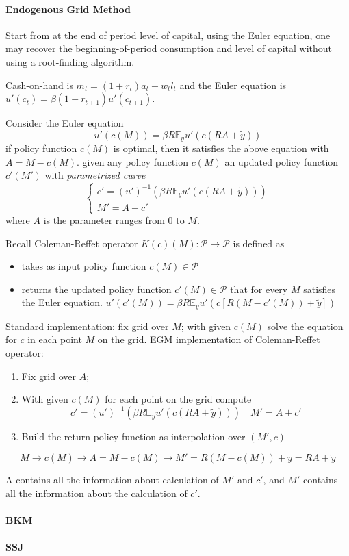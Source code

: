 \documentclass[11pt,a4paper]{article}
\begin{document}
\paragraph{Endogenous Grid Method\citep{carrollMethodEndogenousGridpoints2006}} Start from at the end of period level of capital, using the Euler equation, one may recover the beginning-of-period consumption and level of capital without using a root-finding algorithm. 

Cash-on-hand is $m_t = (1+r_t)a_t + w_t l_t$ and the Euler equation is $u'(c_t) = \beta (1+r_{t+1})u'(c_{t+1})$.


Consider the Euler equation $$ u'(c(M)) = \beta R \mathbb{E}_y u'(c(RA+\tilde{y})) $$
if policy function $c(M)$ is optimal, then it satisfies the above equation with $A = M-c(M)$. given any policy function $c(M)$ an updated policy function $c'(M')$ with \textit{parametrized curve} 
$$ \begin{cases}
    c' = (u')^{-1}\left(\beta R \mathbb{E}_y u'(c(RA+\tilde{y}))\right)\\ 
    M' = A + c'
\end{cases} $$
where $A$ is the parameter ranges from $0$ to $M$. 

Recall Coleman-Reffet operator $K(c)(M):\mathcal{P}\to \mathcal{P}$ is defined as 
\begin{itemize}
    \item takes as input policy function $c(M)\in \mathcal{P}$
    \item returns the updated policy function $c'(M)\in \mathcal{P}$ that for every $M$ satisfies the Euler equation. $u'(c'(M)) = \beta R \mathbb{E}_y u'(c[R(M-c'(M))+\tilde{y}])$
\end{itemize}
Standard implementation: fix grid over $M$; with given $c(M)$ solve the equation for $c$ in each point $M$ on the grid. 
EGM implementation of Coleman-Reffet operator:
\begin{enumerate}
    \item Fix grid over $A$;
    \item With given $c(M)$ for each point on the grid compute $$ c' = (u')^{-1}\left(\beta R\mathbb{E}_y u'(c(RA+\tilde{y}))\right)\quad M' = A + c'$$ 
    \item Build the return policy function as interpolation over $(M',c)$ 
\end{enumerate}
$$ M\to c(M)\to A = M-c(M) \to M' = R(M-c(M))+\tilde{y} = RA+\tilde{y} $$

A contains all the information about calculation of $M'$ and $c'$, and $M'$ contains all the information about the calculation of $c'$.

\paragraph{BKM\citep{boppartExploitingMITShocks2018}}




\paragraph{SSJ\citep{auclertUsingSequenceSpaceJacobian2021}}



\end{document}
